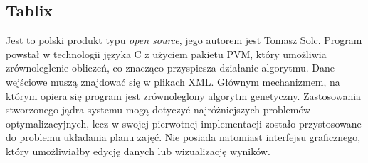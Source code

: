 \subsection{Tablix}
Jest to polski produkt typu \emph{open source}, jego autorem jest Tomasz Solc. Program powstał w technologii języka C z użyciem pakietu PVM, który umożliwia zrównoleglenie obliczeń, co znacząco przyspiesza działanie algorytmu. Dane wejściowe muszą znajdować się w plikach XML. Głównym mechanizmem, na którym opiera się program jest zrównoleglony algorytm genetyczny. Zastosowania stworzonego jądra systemu mogą dotyczyć najróżniejszych problemów optymalizacyjnych, lecz w swojej pierwotnej implementacji zostało przystosowane do problemu układania planu zajęć. Nie posiada natomiast interfejsu graficznego, który umożliwiałby edycję danych lub wizualizację wyników.
